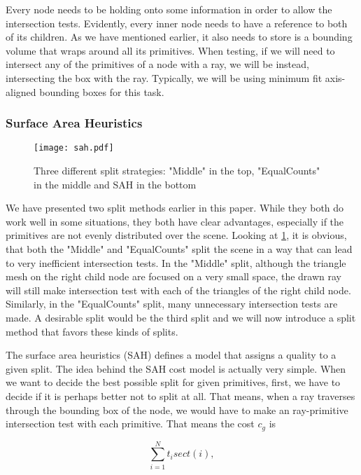 Every node needs to be holding onto some information in order to allow the intersection tests. Evidently, every inner node needs to have a reference to both of its children. As we have mentioned earlier, it also needs to store is a bounding volume that wraps around all its primitives. When testing, if we will need to intersect any of the primitives of a node with a ray, we will be instead, intersecting the box with the ray. Typically, we will be using minimum fit axis-aligned bounding boxes for this task.

\subsubsection{Surface Area Heuristics}
\label{pre:sah}

\begin{figure}
	\begin{center}
		\texttt{[image: sah.pdf]}
		\caption{Three different split strategies: "Middle" in the top, "EqualCounts" in the middle and SAH in the bottom}
		\label{fig:sah}
	\end{center}
\end{figure}


We have presented two split methods earlier in this paper. While they both do work well in some situations, they both have clear advantages, especially if the primitives are not evenly distributed over the scene. Looking at \ref{fig:sah}, it is obvious, that both the "Middle" and "EqualCounts" split the scene in a way that can lead to very inefficient intersection tests. In the "Middle" split, although the triangle mesh on the right child node are focused on a very small space, the drawn ray will still make intersection test with each of the triangles of the right child node. Similarly, in the "EqualCounts" split, many unnecessary intersection tests are made. A desirable split would be the third split and we will now introduce a split method that favors these kinds of splits.

The surface area heuristics (SAH) defines a model that assigns a quality to a given split. The idea behind the SAH cost model is actually very simple. When we want to decide the best possible split for given primitives, first, we have to decide if it is perhaps better not to split at all. That means, when a ray traverses through the bounding box of the node, we would have to make an ray-primitive intersection test with each primitive. That means the cost $c_g$ is 

\begin{equation}
\sum_{i = 1}^{N}t_isect(i),
\end{equation}

